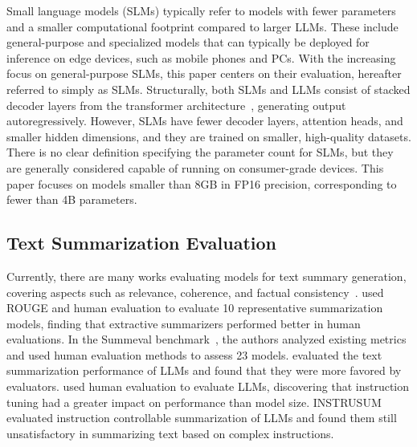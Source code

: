 Small language models (SLMs) typically refer to models with fewer parameters and a smaller computational footprint compared to larger LLMs. These include general-purpose and specialized models that can typically be deployed for inference on edge devices, such as mobile phones and PCs. With the increasing focus on general-purpose SLMs, this paper centers on their evaluation, hereafter referred to simply as SLMs. Structurally, both SLMs and LLMs consist of stacked decoder layers from the transformer architecture~\cite{attention_all_you_need}, generating output autoregressively. However, SLMs have fewer decoder layers, attention heads, and smaller hidden dimensions, and they are trained on smaller, high-quality datasets. There is no clear definition specifying the parameter count for SLMs, but they are generally considered capable of running on consumer-grade devices. This paper focuses on models smaller than 8GB in FP16 precision, corresponding to fewer than 4B parameters.



\subsection{Text Summarization Evaluation}
Currently, there are many works evaluating models for text summary generation, covering aspects such as relevance, coherence, and factual consistency~\cite{huang-etal-2020-achieved,fabbri2021summeval,dead_summarization,zhang2024benchmarking,liu2023benchmarking}. \citet{huang-etal-2020-achieved} used ROUGE and human evaluation to evaluate 10 representative summarization models, finding that extractive summarizers performed better in human evaluations. In the Summeval benchmark~\cite{fabbri2021summeval}, the authors analyzed existing metrics and used human evaluation methods to assess 23 models. \citet{dead_summarization} evaluated the text summarization performance of LLMs and found that they were more favored by evaluators. \citet{zhang2024benchmarking} used human evaluation to evaluate LLMs, discovering that instruction tuning had a greater impact on performance than model size. INSTRUSUM~\cite{liu2023benchmarking} evaluated instruction controllable summarization of LLMs and found them still unsatisfactory in summarizing text based on complex instructions.

